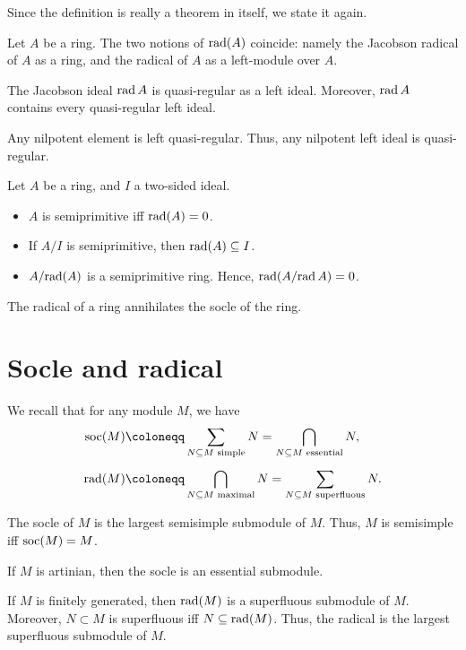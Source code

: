 \documentclass[12pt]{article}
\begin{document}
Since the definition is really a theorem in itself, we state it again.

\jacobsonradical

\begin{thm}
	Let $A$ be a ring. The two notions of $\operatorname{rad}(A)$ coincide: namely the Jacobson radical of $A$ as a ring, and the radical of $A$ as a left-module over $A$.
\end{thm}

\begin{thm}
	The Jacobson ideal $\operatorname{rad} A$ is quasi-regular as a left ideal. \newline
	Moreover, $\operatorname{rad} A$ contains every quasi-regular left ideal.
\end{thm}

\begin{thm}
	Any nilpotent element is left quasi-regular. \newline
	Thus, any nilpotent left ideal is quasi-regular.
\end{thm}

\begin{thm} \label{thm:radical-and-semiprimitivity}
	Let $A$ be a ring, and $I$ a two-sided ideal.
	\begin{itemize}
		\item $A$ is semiprimitive iff $\operatorname{rad}(A) = 0$.
		\item If $A/I$ is semiprimitive, then $\operatorname{rad}(A) \subseteq I$.
		\item $A/{\operatorname{rad}(A)}$ is a semiprimitive ring. Hence, $\operatorname{rad}(A/{\operatorname{rad} A}) = 0$.
	\end{itemize}
\end{thm}

\begin{thm}
	The radical of a ring annihilates the socle of the ring.
\end{thm}

\section{Socle and radical}

We recall that for any module $M$, we have
\begin{align*} 
	\soc(M) &\coloneqq \sum_{N \subset M \text{ simple}} N = \bigcap_{N \subset M \text{ essential}} N, \\[5pt]
	\rad(M) &\coloneqq \bigcap_{N \subset M \text{ maximal}} N  = \sum_{N \subset M \text{ superfluous}} N.
\end{align*}

\begin{thm}
	The socle of $M$ is the largest semisimple submodule of $M$. \newline
	Thus, $M$ is semisimple iff $\operatorname{soc}(M) = M$.

	If $M$ is artinian, then the socle is an essential submodule.
	
	If $M$ is finitely generated, then $\operatorname{rad}(M)$ is a superfluous submodule of $M$. 
	Moreover, $N \subset M$ is superfluous iff $N \subseteq \operatorname{rad}(M)$. 
	Thus, the radical is the largest superfluous submodule of $M$.
\end{thm}
\end{document}
